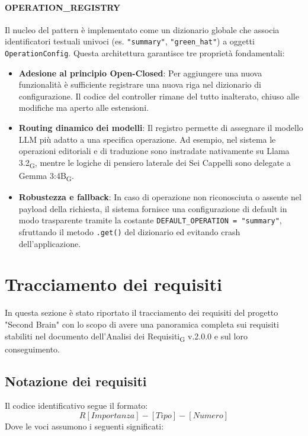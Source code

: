 \documentclass[11pt,a4paper]{article}
\newcommand{\gls}[1]{#1\textsubscript{G}}
\begin{document}
\paragraph{OPERATION\_REGISTRY}
Il nucleo del pattern è implementato come un dizionario globale che associa identificatori testuali univoci (es. \texttt{"summary"}, \texttt{"green\_hat"}) a oggetti \texttt{OperationConfig}. Questa architettura garantisce tre proprietà fondamentali:
\begin{itemize}
    \item \textbf{Adesione al principio Open-Closed}: Per aggiungere una nuova funzionalità è sufficiente registrare una nuova riga nel dizionario di configurazione. Il codice del controller rimane del tutto inalterato, chiuso alle modifiche ma aperto alle estensioni.
    \item \textbf{Routing dinamico dei modelli}: Il registro permette di assegnare il modello LLM più adatto a una specifica operazione. Ad esempio, nel sistema le operazioni editoriali e di traduzione sono instradate nativamente su \gls{Llama 3.2}, mentre le logiche di pensiero laterale dei Sei Cappelli sono delegate a \gls{Gemma 3:4B}.
    \item \textbf{Robustezza e fallback}: In caso di operazione non riconosciuta o assente nel payload della richiesta, il sistema fornisce una configurazione di default in modo trasparente tramite la costante \texttt{DEFAULT\_OPERATION = "summary"}, sfruttando il metodo \texttt{.get()} del dizionario ed evitando crash dell'applicazione.
\end{itemize}


\newpage

\section{Tracciamento dei requisiti}
In questa sezione è stato riportato il tracciamento dei requisiti del progetto "Second Brain" con lo scopo di avere una panoramica completa sui requisiti stabiliti nel documento dell'\gls{Analisi dei Requisiti} v.2.0.0 e sul loro conseguimento.

\subsection{Notazione dei requisiti}
Il codice identificativo segue il formato:
\[
R[Importanza]-[Tipo]-[Numero]
\]
Dove le voci assumono i seguenti significati:
\end{document}
